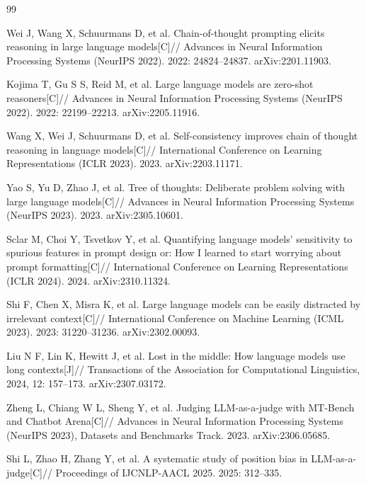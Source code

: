 \documentclass[11pt,a4paper]{article}
\begin{document}
\begin{thebibliography}{99}
\setlength{\itemsep}{0.2em}
 
Wei J, Wang X, Schuurmans D, et al.
Chain-of-thought prompting elicits reasoning in large language models[C]//
Advances in Neural Information Processing Systems (NeurIPS 2022). 2022: 24824--24837.
arXiv:2201.11903.
 
Kojima T, Gu S S, Reid M, et al.
Large language models are zero-shot reasoners[C]//
Advances in Neural Information Processing Systems (NeurIPS 2022). 2022: 22199--22213.
arXiv:2205.11916.
 
Wang X, Wei J, Schuurmans D, et al.
Self-consistency improves chain of thought reasoning in language models[C]//
International Conference on Learning Representations (ICLR 2023). 2023.
arXiv:2203.11171.
 
Yao S, Yu D, Zhao J, et al.
Tree of thoughts: Deliberate problem solving with large language models[C]//
Advances in Neural Information Processing Systems (NeurIPS 2023). 2023.
arXiv:2305.10601.
 
Sclar M, Choi Y, Tsvetkov Y, et al.
Quantifying language models' sensitivity to spurious features in prompt design or: How I learned to start worrying about prompt formatting[C]//
International Conference on Learning Representations (ICLR 2024). 2024.
arXiv:2310.11324.
 
Shi F, Chen X, Misra K, et al.
Large language models can be easily distracted by irrelevant context[C]//
International Conference on Machine Learning (ICML 2023). 2023: 31220--31236.
arXiv:2302.00093.
 
Liu N F, Lin K, Hewitt J, et al.
Lost in the middle: How language models use long contexts[J]//
Transactions of the Association for Computational Linguistics, 2024, 12: 157--173.
arXiv:2307.03172.
 
Zheng L, Chiang W L, Sheng Y, et al.
Judging LLM-as-a-judge with MT-Bench and Chatbot Arena[C]//
Advances in Neural Information Processing Systems (NeurIPS 2023), Datasets and Benchmarks Track. 2023.
arXiv:2306.05685.
 
Shi L, Zhao H, Zhang Y, et al.
A systematic study of position bias in LLM-as-a-judge[C]//
Proceedings of IJCNLP-AACL 2025. 2025: 312--335.
 

\end{thebibliography}
\end{document}
